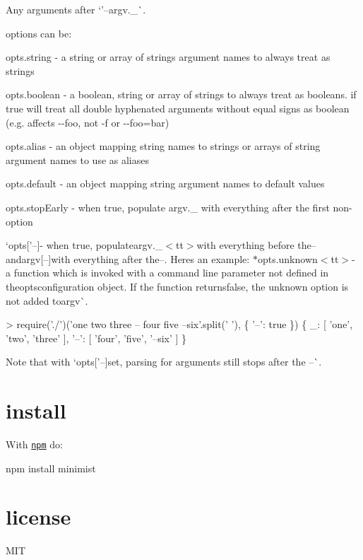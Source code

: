 Any arguments after `'--argv.\+\_\+\`{}.

options can be\+:


\begin{DoxyItemize}
\item {\ttfamily opts.\+string} -\/ a string or array of strings argument names to always treat as strings
\item {\ttfamily opts.\+boolean} -\/ a boolean, string or array of strings to always treat as booleans. if {\ttfamily true} will treat all double hyphenated arguments without equal signs as boolean (e.\+g. affects {\ttfamily -\/-\/foo}, not {\ttfamily -\/f} or {\ttfamily -\/-\/foo=bar})
\item {\ttfamily opts.\+alias} -\/ an object mapping string names to strings or arrays of string argument names to use as aliases
\item {\ttfamily opts.\+default} -\/ an object mapping string argument names to default values
\item {\ttfamily opts.\+stop\+Early} -\/ when true, populate {\ttfamily argv.\+\_\+} with everything after the first non-\/option
\item `opts\mbox{[}'--\textquotesingle{}\mbox{]}{\ttfamily -\/ when true, populate}argv.\+\_\+$<$tt$>$with everything before the--{\ttfamily  and}argv\mbox{[}\textquotesingle{}--\textquotesingle{}\mbox{]}{\ttfamily with everything after the}--{\ttfamily . Here\textquotesingle{}s an example\+: $\ast$}opts.\+unknown$<$tt$>$-\/ a function which is invoked with a command line parameter not defined in theopts{\ttfamily configuration object. If the function returns}false{\ttfamily , the unknown option is not added to}argv\`{}.
\end{DoxyItemize}


\begin{DoxyCode}
> require('./')('one two three -- four five --six'.split(' '), \{ '--': true \})
\{ \_: [ 'one', 'two', 'three' ],
  '--': [ 'four', 'five', '--six' ] \}
\end{DoxyCode}


Note that with `opts\mbox{[}'--\textquotesingle{}\mbox{]}{\ttfamily set, parsing for arguments still stops after the }--\`{}.

\section*{install}

With \href{https://npmjs.org}{\tt npm} do\+:


\begin{DoxyCode}
npm install minimist
\end{DoxyCode}


\section*{license}

M\+IT 